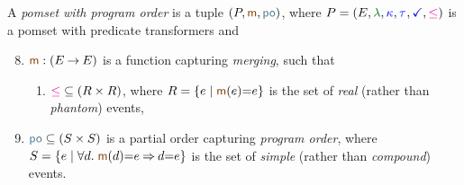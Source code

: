 \begin{definition}
  \label{def:po}
  A \emph{pomset with program order} is a tuple $(\aPS,\rmrg,\rpox)$,
  where $\aPS=(\aEvs, \labeling, \labelingForm, \aTr{}{}, {\aTerm}, {\le})$ %
  is a pomset with predicate transformers and
  \begin{enumerate}[,label=(\textsc{m}\arabic*),ref=\textsc{m}\arabic*]
    \setcounter{enumi}{7}
  \item \label{pom-m} 
    $\fmrg{} : (\aEvs\fun\aEvs)$
    is a function capturing \emph{merging}, such that 
    \begin{enumerate}%
    \item \label{pom-m-real} 
      ${\le}\subseteq(\reEvs\times\reEvs)$, where $\reEvs=\{\aEv\mid\fmrg{\aEv}{=}\aEv\}$ is the set of
      \emph{real} (rather than \emph{phantom}) events,
    \end{enumerate}
  \item \label{pom-po} 
    ${\rpox} \subseteq (\umEvs\times\umEvs)$ is a partial order capturing
    \emph{program order}, where 
    $\umEvs=\{\aEv\mid\forall\bEv.\;\fmrg{\bEv}{=}\aEv \limplies \bEv{=}\aEv\}$
    is the set of \emph{simple} (rather than \emph{compound}) events.
  \end{enumerate}
\end{definition}


